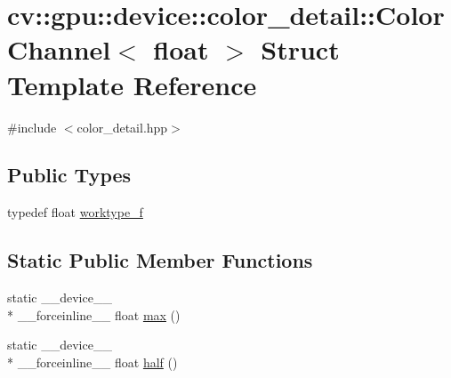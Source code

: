 \hypertarget{structcv_1_1gpu_1_1device_1_1color__detail_1_1ColorChannel_3_01float_01_4}{\section{cv\-:\-:gpu\-:\-:device\-:\-:color\-\_\-detail\-:\-:Color\-Channel$<$ float $>$ Struct Template Reference}
\label{structcv_1_1gpu_1_1device_1_1color__detail_1_1ColorChannel_3_01float_01_4}
}


{\ttfamily \#include $<$color\-\_\-detail.\-hpp$>$}

\subsection*{Public Types}
\begin{DoxyCompactItemize}
\item 
typedef float \hyperlink{structcv_1_1gpu_1_1device_1_1color__detail_1_1ColorChannel_3_01float_01_4_ab5166955a676285adf53eeb416c194fa}{worktype\-\_\-f}
\end{DoxyCompactItemize}
\subsection*{Static Public Member Functions}
\begin{DoxyCompactItemize}
\item 
static \-\_\-\-\_\-device\-\_\-\-\_\- \\*
\-\_\-\-\_\-forceinline\-\_\-\-\_\- float \hyperlink{structcv_1_1gpu_1_1device_1_1color__detail_1_1ColorChannel_3_01float_01_4_a143e14a7fc61ea5f2d7f49143cdd5d34}{max} ()
\item 
static \-\_\-\-\_\-device\-\_\-\-\_\- \\*
\-\_\-\-\_\-forceinline\-\_\-\-\_\- float \hyperlink{structcv_1_1gpu_1_1device_1_1color__detail_1_1ColorChannel_3_01float_01_4_a5326d7bb9cabfee3753845da60757051}{half} ()
\end{DoxyCompactItemize}


